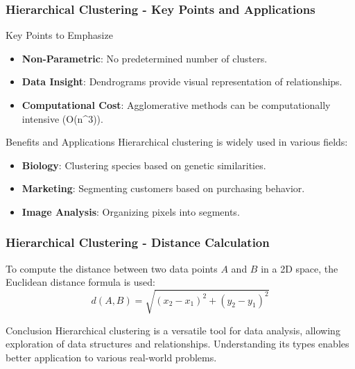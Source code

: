 \documentclass[aspectratio=169]{beamer}
\begin{document}
\begin{frame}[fragile]
    \frametitle{Hierarchical Clustering - Key Points and Applications}
    \begin{block}{Key Points to Emphasize}
        \begin{itemize}
            \item \textbf{Non-Parametric}: No predetermined number of clusters.
            \item \textbf{Data Insight}: Dendrograms provide visual representation of relationships.
            \item \textbf{Computational Cost}: Agglomerative methods can be computationally intensive (O(n^3)).
        \end{itemize}
    \end{block}

    \begin{block}{Benefits and Applications}
        Hierarchical clustering is widely used in various fields:
        \begin{itemize}
            \item \textbf{Biology}: Clustering species based on genetic similarities.
            \item \textbf{Marketing}: Segmenting customers based on purchasing behavior.
            \item \textbf{Image Analysis}: Organizing pixels into segments.
        \end{itemize}
    \end{block}
\end{frame}

\begin{frame}[fragile]
    \frametitle{Hierarchical Clustering - Distance Calculation}
    To compute the distance between two data points \( A \) and \( B \) in a 2D space, the Euclidean distance formula is used:
    \begin{equation}
        d(A, B) = \sqrt{(x_2 - x_1)^2 + (y_2 - y_1)^2}
    \end{equation}
    
    \begin{block}{Conclusion}
        Hierarchical clustering is a versatile tool for data analysis, allowing exploration of data structures and relationships. 
        Understanding its types enables better application to various real-world problems.
    \end{block}
\end{frame}
\end{document}
